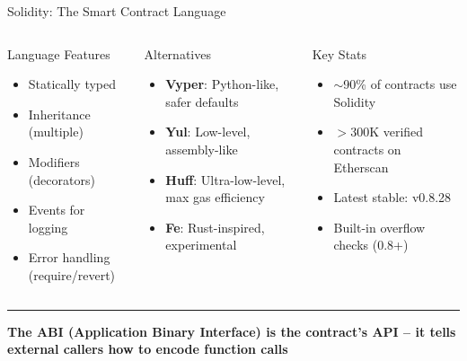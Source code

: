 \documentclass[8pt,aspectratio=169]{beamer}
\newcommand{\bottomnote}[1]{\vfill\vspace{-2mm}\textcolor{mllavender2}{\rule{\textwidth}{0.4pt}}\vspace{1mm}\footnotesize\textbf{#1}}
\begin{document}
\begin{frame}{Solidity: The Smart Contract Language}
\begin{columns}
\begin{block}{Language Features}
\begin{itemize}\small
  \item Statically typed
  \item Inheritance (multiple)
  \item Modifiers (decorators)
  \item Events for logging
  \item Error handling (require/revert)
\end{itemize}
\end{block}
\begin{block}{Alternatives}
\begin{itemize}\small
  \item \textbf{Vyper}: Python-like, safer defaults
  \item \textbf{Yul}: Low-level, assembly-like
  \item \textbf{Huff}: Ultra-low-level, max gas efficiency
  \item \textbf{Fe}: Rust-inspired, experimental
\end{itemize}
\end{block}
\begin{block}{Key Stats}
\begin{itemize}\small
  \item $\sim$90\% of contracts use Solidity
  \item $>$300K verified contracts on Etherscan
  \item Latest stable: v0.8.28
  \item Built-in overflow checks (0.8+)
\end{itemize}
\end{block}
\end{columns}
\bottomnote{The ABI (Application Binary Interface) is the contract's API -- it tells external callers how to encode function calls}
\end{frame}
\end{document}
